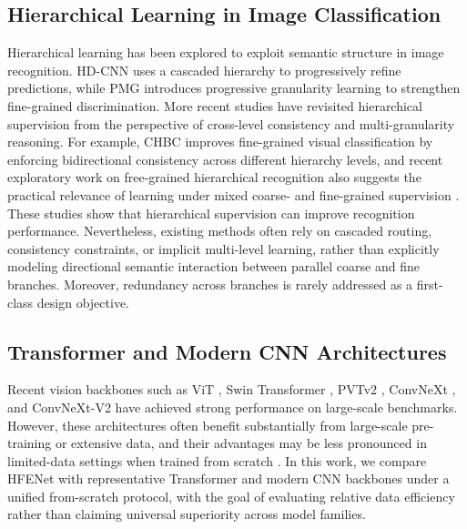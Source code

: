 \documentclass[pdflatex,sn-mathphys-num]{sn-jnl}
\theoremstyle{thmstyleone}%
\theoremstyle{thmstyletwo}%
\theoremstyle{thmstylethree}%
\begin{document}
\subsection{Hierarchical Learning in Image Classification}
Hierarchical learning has been explored to exploit semantic structure in image recognition. 
HD-CNN \cite{yan2015hdcnn} uses a cascaded hierarchy to progressively refine predictions, while PMG \cite{du2020fine} introduces progressive granularity learning to strengthen fine-grained discrimination. 
More recent studies have revisited hierarchical supervision from the perspective of cross-level consistency and multi-granularity reasoning. 
For example, CHBC \cite{gao2025chbc} improves fine-grained visual classification by enforcing bidirectional consistency across different hierarchy levels, and recent exploratory work on free-grained hierarchical recognition also suggests the practical relevance of learning under mixed coarse- and fine-grained supervision \cite{park2025freegrained}. 
These studies show that hierarchical supervision can improve recognition performance. 
Nevertheless, existing methods often rely on cascaded routing, consistency constraints, or implicit multi-level learning, rather than explicitly modeling directional semantic interaction between parallel coarse and fine branches. 
Moreover, redundancy across branches is rarely addressed as a first-class design objective.

\subsection{Transformer and Modern CNN Architectures}
Recent vision backbones such as ViT \cite{dosovitskiy2020image}, Swin Transformer \cite{liu2021swin}, PVTv2 \cite{wang2022pvt}, ConvNeXt \cite{liu2022convnext}, and ConvNeXt-V2 \cite{woo2023convnextv2} have achieved strong performance on large-scale benchmarks. 
However, these architectures often benefit substantially from large-scale pre-training or extensive data, and their advantages may be less pronounced in limited-data settings when trained from scratch \cite{touvron2021training}.
In this work, we compare HFENet with representative Transformer and modern CNN backbones under a unified from-scratch protocol, with the goal of evaluating relative data efficiency rather than claiming universal superiority across model families.
\end{document}
